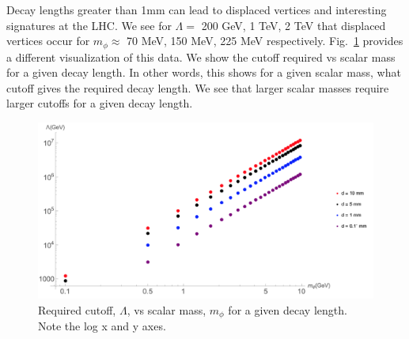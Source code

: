 \documentclass[aps,onecolumn,twoside,secnumarabic,balancelastpage,amsmath,amssymb,nofootinbib,hyperref=pdftex]{revtex4}
\begin{document}
Decay lengths greater than 1mm can lead to displaced vertices and interesting signatures at the LHC. We see for $\Lambda =$ 200 GeV, 1 TeV, 2 TeV that displaced vertices occur for $m_{\phi} \approx$ 70 MeV, 150 MeV, 225 MeV respectively. 
\vskip 0.12in
Fig.~\ref{fig:4} provides a different visualization of this data. We show the cutoff required vs scalar mass for a given decay length. In other words, this shows for a given scalar mass, what cutoff gives the required decay length. We see that larger scalar masses require larger cutoffs for a given decay length.
\begin{figure}[t]
\begin{center}
\includegraphics[width=14cm]{mass_vs_lambda.png}
\caption{Required cutoff, $\Lambda$, vs scalar mass, $m_{\phi}$ for a given decay length. Note the log x and y axes.}
\label{fig:4}
\end{center}
\end{figure}
\end{document}
